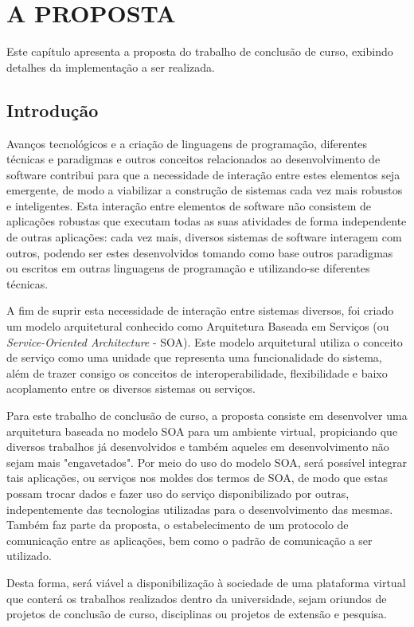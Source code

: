 \chapter[A PROPOSTA]{A PROPOSTA}

Este capítulo apresenta a proposta do trabalho de conclusão de curso, exibindo detalhes da implementação a ser realizada.

\section{Introdução}
Avanços tecnológicos e a criação de linguagens de programação, diferentes técnicas e paradigmas e outros conceitos relacionados ao desenvolvimento de software contribui para que a necessidade de interação entre estes elementos seja emergente, de modo a viabilizar a construção de sistemas cada vez mais robustos e inteligentes. Esta interação entre elementos de software não consistem de aplicações robustas que executam todas as suas atividades de forma independente de outras aplicações: cada vez mais, diversos sistemas de software interagem com outros, podendo ser estes desenvolvidos tomando como base outros paradigmas ou escritos em outras linguagens de programação e utilizando-se diferentes técnicas.

A fim de suprir esta necessidade de interação entre sistemas diversos, foi criado um modelo arquitetural conhecido como Arquitetura Baseada em Serviços (ou \textit{Service-Oriented Architecture} - SOA). Este modelo arquitetural utiliza o conceito de serviço como uma unidade que representa uma funcionalidade do sistema, além de trazer consigo os conceitos de interoperabilidade, flexibilidade e baixo acoplamento entre os diversos sistemas ou serviços.

Para este trabalho de conclusão de curso, a proposta consiste em desenvolver uma arquitetura baseada no modelo SOA para um ambiente virtual, propiciando que diversos trabalhos já desenvolvidos e também aqueles em desenvolvimento não sejam mais "engavetados". Por meio do uso do modelo SOA, será possível integrar tais aplicações, ou serviços nos moldes dos termos de SOA, de modo que estas possam trocar dados e fazer uso do serviço disponibilizado por outras, indepentemente das tecnologias utilizadas para o desenvolvimento das mesmas. Também faz parte da proposta, o estabelecimento de um protocolo de comunicação entre as aplicações, bem como o padrão de comunicação a ser utilizado.

Desta forma, será viável a disponibilização à sociedade de uma plataforma virtual que conterá os trabalhos realizados dentro da universidade, sejam oriundos de projetos de conclusão de curso, disciplinas ou projetos de extensão e pesquisa.

